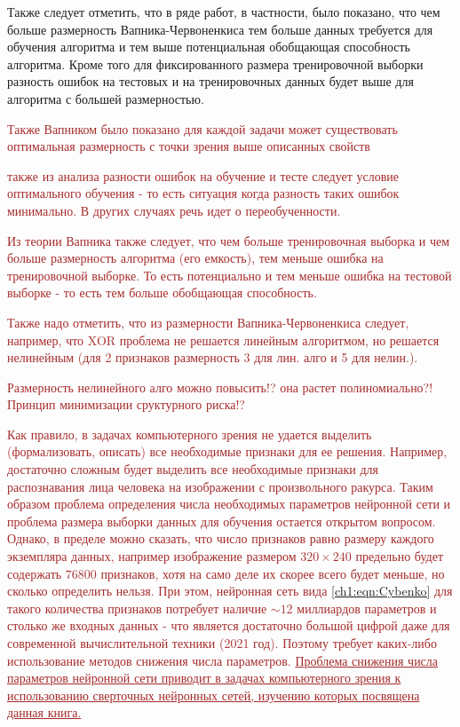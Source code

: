 \documentclass[12pt]{article}
\begin{document}
\begin{sloppypar}
Также следует отметить, что в ряде работ, в частности,  \cite{vapnik1982estimation, vapnik1994measuring} 
было показано, что чем больше размерность Вапника-Червоненкиса тем больше данных требуется для обучения алгоритма и тем выше потенциальная обобщающая способность алгоритма. Кроме того для фиксированного размера тренировочной выборки разность ошибок на тестовых и на тренировочных данных будет выше для алгоритма с большей размерностью. 

\textcolor{brown}{
Также Вапником было показано для каждой задачи может существовать оптимальная размерность с точки зрения выше описанных свойств \cite{vapnik1974recognition}
}

\textcolor{brown}{
также из анализа разности ошибок на обучение и тесте следует условие оптимального обучения - то есть ситуация когда разность таких ошибок минимально. В других случаях речь идет о переобученности.
}

\textcolor{brown}{
Из теории Вапника также следует, что чем больше тренировочная выборка и чем больше размерность алгоритма (его емкость), тем меньше ошибка на тренировочной выборке. То есть потенциально и тем меньше ошибка на тестовой выборке - то есть тем больше обобщающая способность.
}

\textcolor{brown}{
Также надо отметить, что из размерности Вапника-Червоненкиса следует, например, что XOR проблема не решается линейным алгоритмом, но решается нелинейным (для 2 признаков размерность 3 для лин. алго и 5 для нелин.). 
}

\textcolor{brown}{
Размерность нелинейного алго можно повысить!? она растет полиномиально?!
Принцип минимизации сруктурного риска!?
}

\textcolor{brown}{
Как правило, в задачах компьютерного зрения не удается выделить (формализовать, описать) все необходимые признаки для ее решения. Например, достаточно сложным будет выделить все необходимые признаки для распознавания лица человека на изображении с произвольного ракурса. Таким образом проблема определения числа необходимых параметров нейронной сети и проблема размера выборки данных для обучения остается открытом вопросом.  Однако, в пределе можно сказать, что число признаков равно размеру каждого экземпляра данных, например изображение размером $320\times 240$ предельно будет содержать $76 800$ признаков, хотя на само деле их скорее всего будет меньше, но сколько определить нельзя. При этом, нейронная сеть вида \ref{ch1:eqn:Cybenko} 
для такого количества признаков потребует наличие $\sim 12$ миллиардов параметров и столько же входных данных - что является достаточно большой цифрой даже для современной вычислительной техники (2021 год). Поэтому требует каких-либо использование методов снижения числа параметров. 
\uline{Проблема снижения числа параметров нейронной сети приводит в задачах компьютерного зрения к использованию сверточных нейронных сетей, изучению которых посвящена данная книга.} }


\end{sloppypar}
\end{document}

